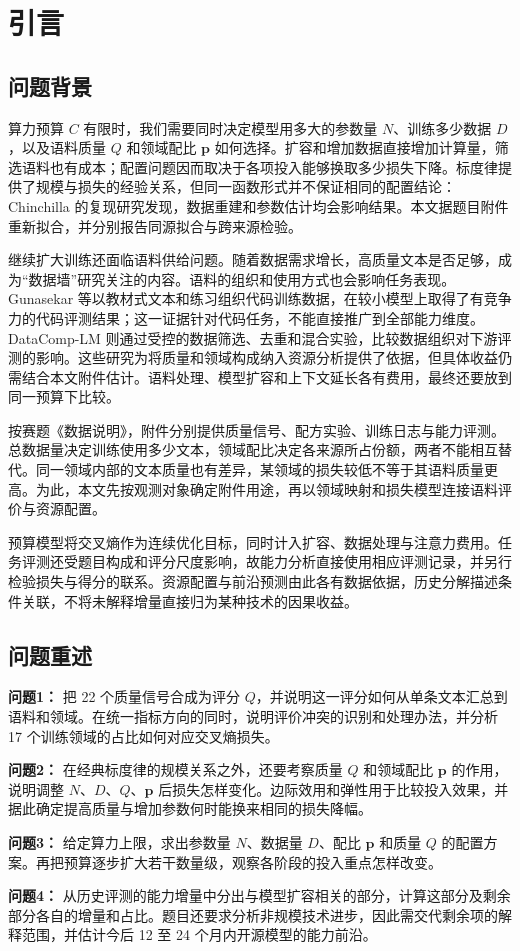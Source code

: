 \section{引言}
\subsection{问题背景}

算力预算 $C$ 有限时，我们需要同时决定模型用多大的参数量 $N$、训练多少数据 $D$，以及语料质量 $Q$ 和领域配比 $\bm p$ 如何选择。扩容和增加数据直接增加计算量，筛选语料也有成本；配置问题因而取决于各项投入能够换取多少损失下降。标度律提供了规模与损失的经验关系\cite{kaplan2020scaling,hoffmann2022chinchilla}，但同一函数形式并不保证相同的配置结论：Chinchilla 的复现研究发现，数据重建和参数估计均会影响结果\cite{besiroglu2024replication}。本文据题目附件重新拟合，并分别报告同源拟合与跨来源检验。

继续扩大训练还面临语料供给问题。随着数据需求增长，高质量文本是否足够，成为“数据墙”研究关注的内容\cite{villalobos2022data}。语料的组织和使用方式也会影响任务表现。Gunasekar 等以教材式文本和练习组织代码训练数据，在较小模型上取得了有竞争力的代码评测结果；这一证据针对代码任务，不能直接推广到全部能力维度\cite{gunasekar2023textbooks}。DataComp-LM 则通过受控的数据筛选、去重和混合实验，比较数据组织对下游评测的影响\cite{li2024datacomp}。这些研究为将质量和领域构成纳入资源分析提供了依据，但具体收益仍需结合本文附件估计。语料处理、模型扩容和上下文延长各有费用，最终还要放到同一预算下比较。

按赛题《数据说明》\cite{contest_data_notes}，附件分别提供质量信号、配方实验、训练日志与能力评测。总数据量决定训练使用多少文本，领域配比决定各来源所占份额，两者不能相互替代。同一领域内部的文本质量也有差异，某领域的损失较低不等于其语料质量更高。为此，本文先按观测对象确定附件用途，再以领域映射和损失模型连接语料评价与资源配置。

预算模型将交叉熵作为连续优化目标，同时计入扩容、数据处理与注意力费用。任务评测还受题目构成和评分尺度影响，故能力分析直接使用相应评测记录，并另行检验损失与得分的联系。资源配置与前沿预测由此各有数据依据，历史分解描述条件关联，不将未解释增量直接归为某种技术的因果收益。

\subsection{问题重述}

\textbf{问题1：} 把 22 个质量信号合成为评分 $Q$，并说明这一评分如何从单条文本汇总到语料和领域。在统一指标方向的同时，说明评价冲突的识别和处理办法，并分析 17 个训练领域的占比如何对应交叉熵损失。

\textbf{问题2：} 在经典标度律的规模关系之外，还要考察质量 $Q$ 和领域配比 $\bm{p}$ 的作用，说明调整 $N$、$D$、$Q$、$\bm{p}$ 后损失怎样变化。边际效用和弹性用于比较投入效果，并据此确定提高质量与增加参数何时能换来相同的损失降幅。

\textbf{问题3：} 给定算力上限，求出参数量 $N$、数据量 $D$、配比 $\bm{p}$ 和质量 $Q$ 的配置方案。再把预算逐步扩大若干数量级，观察各阶段的投入重点怎样改变。

\textbf{问题4：} 从历史评测的能力增量中分出与模型扩容相关的部分，计算这部分及剩余部分各自的增量和占比。题目还要求分析非规模技术进步，因此需交代剩余项的解释范围，并估计今后 12 至 24 个月内开源模型的能力前沿。
